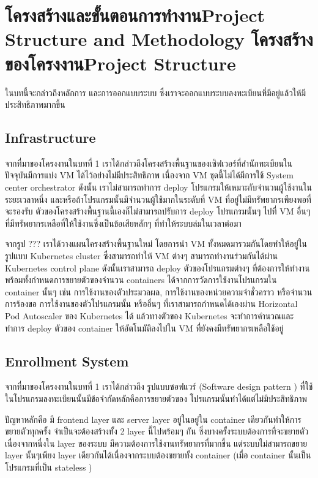 \chapter{\ifproject%
\ifcpe โครงสร้างและขั้นตอนการทำงาน\else Project Structure and Methodology\fi
\else%
\ifcpe โครงสร้างของโครงงาน\else Project Structure\fi
\fi
}

ในบทนี้จะกล่าวถึงหลักการ และการออกแบบระบบ ซึ่งเราจะออกแบบระบบลงทะเบียนที่มีอยู่แล้วให้มีประสิทธิภาพมากขึ้น

\makeatletter

\section {Infrastructure}

จากที่มาของโครงงานในบทที่ 1 เราได้กล่าวถึงโครงสร้างพื้นฐานของเซิฟเวอร์ที่สำนักทะเบียนในปัจจุบันมีการแบ่ง VM \cite{vm} ได้ไว้อย่างไม่มีประสิทธิภาพ เนื่องจาก VM ชุดนี้ไม่ได้มีการใช้ System center orchestrator \cite{sco} ดังนั้น เราไม่สามารถทำการ deploy โปรแกรมให้เหมาะกับจำนวนผู้ใช้งานในระยะเวลาหนึ่ง และหรือถ้าโปรแกรมนั้นมีจำนวนผู้ใช้มากในระดับที่ VM ที่อยู่ไม่มีทรัพยากรเพืยงพอที่จะรองรับ ตัวของโครงสร้างพื้นฐานนี้เองก็ไม่สามารถปรับการ deploy โปรแกรมนั้นๆ ไปที่ VM อื่นๆ ที่มีทรัพยากรเหลือที่ให้ใช้งานซึ่งเป็นข้อเสียหลักๆ ที่ทำให้ระบบล่มในเวลาต่อมา

จากรูป ??? เราได้วางแผนโครงสร้างพื้นฐานใหม่ โดยการนำ VM ทั้งหมดมารวมกันโดยทำให้อยู่ในรูปแบบ Kubernetes cluster ซึ่งสามารถทำให้ VM ต่างๆ สามารถทำงานร่วมกันได้ผ่าน Kubernetes control plane \cite{kubecomp} ดังนั้นเราสามารถ deploy ตัวของโปรแกรมต่างๆ ที่ต้องการให้ทำงานพร้อมทั้งกำหนดการขยายตัวของจำนวน containers ได้จากการวัดการใช้่งานโปรแกรมใน container นั้นๆ เช่น การใช้งานของตัวประมวลผล, การใช้งานของหน่วยความจำชั่วคราว หรือจำนวนการร้องขอ การใช้งานของตัวโปรแกรมนั้น หรืออื่นๆ ที่เราสามารถกำหนดได้เองผ่าน Horizontal Pod Autoscaler \cite{kubehpa} ของ Kubernetes ได้ แล้วทางตัวของ Kubernetes จะทำการคำนวณและทำการ deploy ตัวของ container ให้อัตโนมัติลงไปใน VM ที่ยังคงมีทรัพยากรเหลือใช้อยู่

\section {Enrollment System}

จากที่มาของโครงงานในบทที่ 1 เราได้กล่าวถึง รูปแบบซอฟแวร์ (Software design pattern \cite{sdp}) ที่ใช้ในโปรแกรมลงทะเบียนนั้นมีข้อจำกัดหลักคือการขยายตัวของ โปรแกรมนั้นทำได้แต่ไม่มีประสิทธิภาพ

ปัญหาหลักคือ มี frontend layer และ server layer อยู่ในอยู่ใน container เดียวกันทำให้การขยายตัวทุกครั้ง จำเป็นจะต้องสร้างทั้ง 2 layer นี้ไปพร้อมๆ กัน ซึ่งบางครั้งระบบต้องการที่จะขยายตัวเนื่องจากหนึ่งใน layer ของระบบ มีความต้องการใช้งานทรัพยากรที่มากขึ้น แต่ระบบไม่สามารถขยาย layer นั้นๆเพียง layer เดียวกันได้เนื่องจากระบบต้องขยายทั้ง container (เมื่อ container นั้นเป็นโปรแกรมที่เป็น stateless \cite{slsf})

